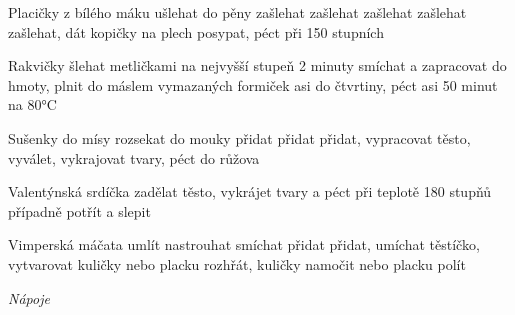 \documentclass[12pt,a4paper]{article}
\begin{document}
\begin{recipe}{Placičky z bílého máku}
   ušlehat do pěny
   zašlehat
   zašlehat
   zašlehat
   zašlehat
   zašlehat, dát kopičky na plech
   posypat, péct při 150 stupních
\end{recipe}
\newpage

\begin{recipe}{Rakvičky}
   šlehat metličkami na nejvyšší stupeň 2 minuty
   smíchat a zapracovat do hmoty, plnit do máslem vymazaných formiček asi do čtvrtiny, péct asi 50 minut na 80°C
\end{recipe}
\newpage

\begin{recipe}{Sušenky}
   do mísy
   rozsekat do mouky
   přidat
   přidat
   přidat, vypracovat těsto, vyválet, vykrajovat tva\-ry, péct do růžova
\end{recipe}
\newpage

\begin{recipe}{Valentýnská srdíčka}
   zadělat těsto, vykrájet tvary a péct při teplotě 180 stupňů
   případně potřít a slepit
\end{recipe}
\newpage

\begin{recipe}{Vimperská máčata}
   umlít
   nastrouhat
   smíchat
   přidat
   přidat, umíchat těstíčko, vytvarovat kuličky nebo placku
   rozhřát, kuličky namočit nebo placku polít
\end{recipe}
\newpage

\vspace*{\fill}
\hfill {\Huge\it Nápoje}\hfill
\vspace*{\fill}
\newpage
\end{document}
